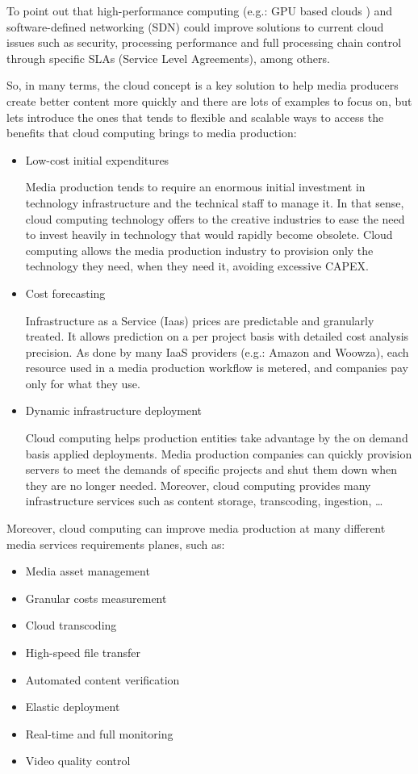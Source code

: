To point out that high-performance computing (e.g.: GPU based clouds \cite{gpu}) and software-defined networking (SDN) could improve solutions to current cloud issues such as security, processing performance and full processing chain control through specific SLAs (Service Level Agreements), among others.

So, in many terms, the cloud concept is a key solution to help media producers create better content more quickly and there are lots of examples to focus on, but lets introduce the ones that tends to flexible and scalable ways to access the benefits that cloud computing brings to media production:

\begin{itemize}
\item Low-cost initial expenditures \hfill 

Media production tends to require an enormous initial investment in technology infrastructure and the technical staff to manage it. In that sense, cloud computing technology offers to the creative industries to ease the need to invest heavily in technology that would rapidly become obsolete. Cloud computing allows the media production industry to provision only the technology they need, when they need it, avoiding excessive CAPEX.

\item Cost forecasting\hfill 

Infrastructure as a Service (Iaas) prices are predictable and granularly treated. It allows prediction on a per project basis with detailed cost analysis precision. As done by many IaaS providers (e.g.: Amazon and Woowza), each resource used in a media production workflow is metered, and companies pay only for what they use.

\item Dynamic infrastructure deployment \hfill 

Cloud computing helps production entities take advantage by the on demand basis applied deployments. Media production companies can quickly provision servers to meet the demands of specific projects and shut them down when they are no longer needed. Moreover, cloud computing provides many infrastructure services such as content storage, transcoding, ingestion, \ldots
\end{itemize}

Moreover, cloud computing can improve media production at many different media services requirements planes, such as:

\begin{itemize}
\item Media asset management
\item Granular costs measurement
\item Cloud transcoding
\item High-speed file transfer
\item Automated content verification
\item Elastic deployment
\item Real-time and full monitoring
\item Video quality control
\end{itemize}

